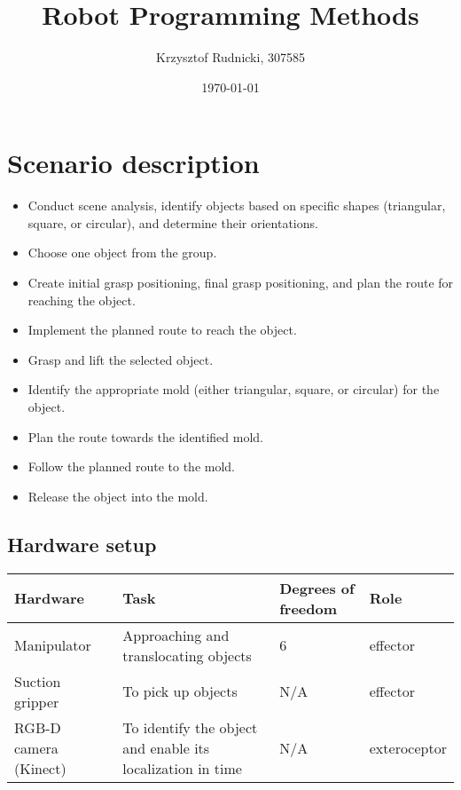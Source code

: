 \documentclass[12pt]{article}
\title{Robot Programming Methods}
\author{Krzysztof Rudnicki, 307585}
\date{\today}
\begin{document}
\maketitle
\section{Scenario description}
\begin{itemize}
	\item Conduct scene analysis, identify objects based on specific shapes (triangular, square, or circular), and determine their orientations.
	\item Choose one object from the group.
	\item Create initial grasp positioning, final grasp positioning, and plan the route for reaching the object.
	\item Implement the planned route to reach the object.
	\item Grasp and lift the selected object.
	\item Identify the appropriate mold (either triangular, square, or circular) for the object.
	\item Plan the route towards the identified mold.
	\item Follow the planned route to the mold.
	\item Release the object into the mold.
\end{itemize}
\subsection{Hardware setup}

\begin{center}
\begin{tabular}{ | p{3cm} | p{3cm} | p{3cm} | p{3cm} |}
\hline
Hardware & Task & Degrees of freedom & Role \\ 
 \hline
Manipulator & Approaching and translocating objects & 6 & effector \\
 \hline
Suction gripper & To pick up objects & N/A & effector \\
 \hline
 RGB-D camera (Kinect) & To identify the object and enable its localization in time & N/A & exteroceptor \\

 \hline
\end{tabular}
\end{center}
\end{document}
